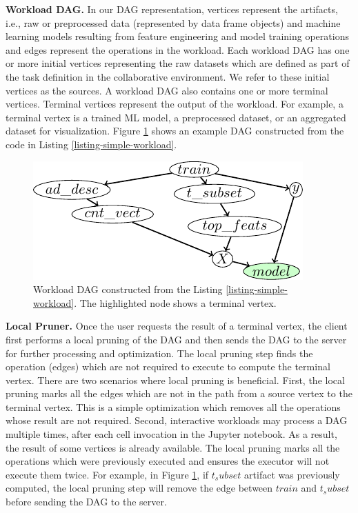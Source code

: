 \textbf{Workload DAG.}
In our DAG representation, vertices represent the artifacts, i.e., raw or preprocessed data (represented by data frame objects) and machine learning models resulting from feature engineering and model training operations and edges represent the operations in the workload.
Each workload DAG has one or more initial vertices representing the raw datasets which are defined as part of the task definition in the collaborative environment.
We refer to these initial vertices as the sources.
A workload DAG also contains one or more terminal vertices.
Terminal vertices represent the output of the workload.
For example, a terminal vertex is a trained ML model, a preprocessed dataset, or an aggregated dataset for visualization. 
Figure \ref{fig-workload-dag} shows an example DAG constructed from the code in Listing \ref{listing-simple-workload}.
\begin{figure}
\centering
\includegraphics[width=\linewidth]{../images/tikz-standalone/example-graph}
\caption{Workload DAG constructed from the Listing \ref{listing-simple-workload}. The highlighted node shows a terminal vertex.}
\label{fig-workload-dag}
\end{figure}

\textbf{Local Pruner.}
Once the user requests the result of a terminal vertex, the client first performs a local pruning of the DAG and then sends the DAG to the server for further processing and optimization.
The local pruning step finds the operation (edges) which are not required to execute to compute the terminal vertex.
There are two scenarios where local pruning is beneficial.
First, the local pruning marks all the edges which are not in the path from a source vertex to the terminal vertex.
This is a simple optimization which removes all the operations whose result are not required.
Second, interactive workloads may process a DAG multiple times, after each cell invocation in the Jupyter notebook.
As a result, the result of some vertices is already available.
The local pruning marks all the operations which were previously executed and ensures the executor will not execute them twice.
For example, in Figure \ref{fig-workload-dag}, if $t_subset$ artifact was previously computed, the local pruning step will remove the edge between $train$ and $t_subset$ before sending the DAG to the server.

